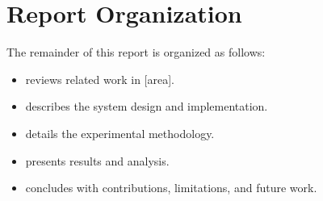 \section{Report Organization}
\label{sec:ch1:organization}

The remainder of this report is organized as follows:
\begin{itemize}
    \item \textbf{} reviews related work in [area].
    \item \textbf{} describes the system design and implementation.
    \item \textbf{} details the experimental methodology.
    \item \textbf{} presents results and analysis.
    \item \textbf{} concludes with contributions, limitations, and future work.
\end{itemize}

